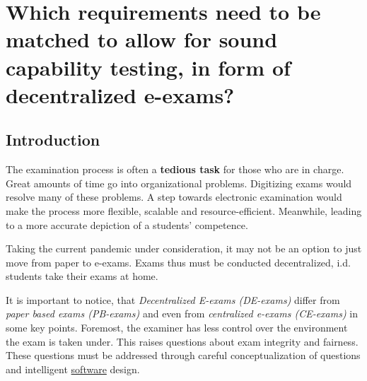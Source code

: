 \hypertarget{which-requirements-need-to-be-matched-to-allow-for-sound-capability-testing-in-form-of-decentralized-e-exams}{%
\section{Which requirements need to be matched to allow for sound
capability testing, in form of decentralized
e-exams?}\label{which-requirements-need-to-be-matched-to-allow-for-sound-capability-testing-in-form-of-decentralized-e-exams}}

\hypertarget{introduction}{%
\subsection{Introduction}\label{introduction}}

The examination process is often a \textbf{tedious task} for those who
are in charge. Great amounts of time go into organizational problems.
Digitizing exams would resolve many of these problems. A step towards
electronic examination would make the process more flexible, scalable
and resource-efficient. Meanwhile, leading to a more accurate depiction
of a students' competence.

Taking the current pandemic under consideration, it may not be an option
to just move from paper to e-exams. Exams thus must be conducted
decentralized, i.d. students take their exams at home.

It is important to notice, that \emph{Decentralized E-exams (DE-exams)}
differ from \emph{paper based exams (PB-exams)} and even from
\emph{centralized e-exams (CE-exams)} in some key points. Foremost, the
examiner has less control over the environment the exam is taken under.
This raises questions about exam integrity and fairness. These questions
must be addressed through careful conceptualization of questions and
intelligent \protect\hyperlink{software}{software} design.

